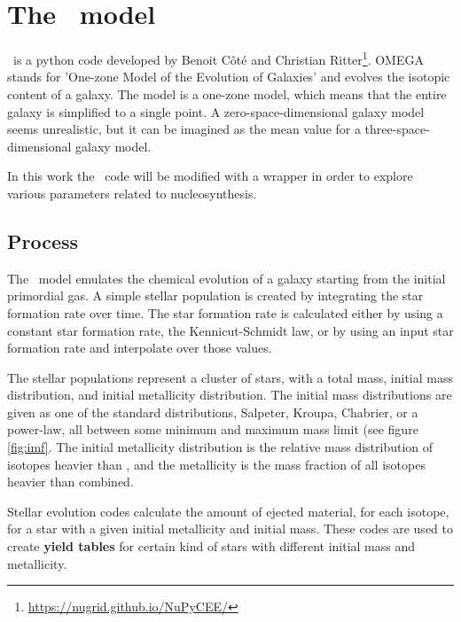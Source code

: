 \section{The \omegamodel\ model}
\label{sec:omega}
\omegamodel\ is a python code developed by Benoit C\^{o}t\'{e} and Christian Ritter\footnote{\url{https://nugrid.github.io/NuPyCEE/}}.
OMEGA stands for 'One-zone Model of the Evolution of Galaxies' and evolves the isotopic content of a galaxy.
The model is a one-zone model, which means that the entire galaxy is simplified to a single point.
A zero-space-dimensional galaxy model seems unrealistic, but it can be imagined as the mean value for a three-space-dimensional galaxy model.

\begin{figure}
  
\end{figure}

In this work the \omegamodel\ code will be modified with a wrapper in order to explore various parameters related to nucleosynthesis.

\subsection{Process}
\label{sec:omega-process}
The \omegamodel\ model emulates the chemical evolution of a galaxy starting from the initial primordial gas. A simple stellar population is created by integrating the star formation rate over time.
The star formation rate is calculated either by using a constant star formation rate, the Kennicut-Schmidt law, or by using an input star formation rate and interpolate over those values.

The stellar populations represent a cluster of stars, with a total mass, initial mass distribution, and initial metallicity distribution.
The initial mass distributions are given as one of the standard distributions, Salpeter, Kroupa, Chabrier, or a power-law, all between some minimum and maximum mass limit (see figure \ref{fig:imf}.
The initial metallicity distribution is the relative mass distribution of isotopes heavier than , and the metallicity is the mass fraction of all isotopes heavier than  combined.


Stellar evolution codes calculate the amount of ejected material, for each isotope, for a star with a given initial metallicity and initial mass. These codes are used to create \textbf{yield tables} for certain kind of stars with different initial mass and metallicity.

